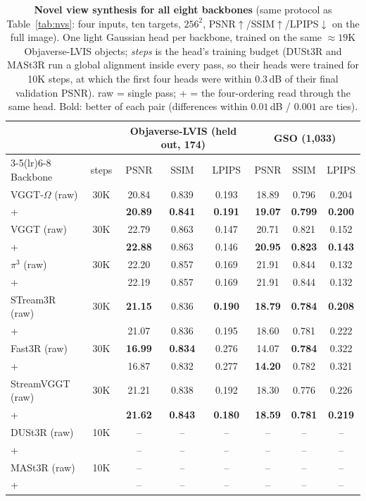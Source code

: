 \begin{table}[t]
\centering\scriptsize\setlength{\tabcolsep}{3.5pt}
\caption{\textbf{Novel view synthesis for all eight backbones} (same protocol as Table~\ref{tab:nvs}: four inputs, ten targets,
$256^2$, PSNR$\uparrow$/SSIM$\uparrow$/LPIPS$\downarrow$ on the full image). One light Gaussian head per backbone, trained on the same
${\approx}19$K Objaverse-LVIS objects; \emph{steps} is the head's training budget (DUSt3R and MASt3R run a global alignment
inside every pass, so their heads were trained for 10K steps, at which the first four heads were within $0.3$\,dB of their
final validation PSNR). raw = single pass; +\smr{} = the four-ordering read through the same head. Bold: better of each pair
(differences within $0.01$\,dB / $0.001$ are ties).}
\label{tab:nvs-full}
\begin{tabular}{@{}l c ccc ccc@{}}
\toprule
& & \multicolumn{3}{c}{Objaverse-LVIS (held out, 174)} & \multicolumn{3}{c}{GSO (1{,}033)} \\
\cmidrule(lr){3-5}\cmidrule(lr){6-8}
Backbone & steps & PSNR & SSIM & LPIPS & PSNR & SSIM & LPIPS \\
\midrule
VGGT-$\Omega$ (raw) & 30K & 20.84 & 0.839 & 0.193 & 18.89 & 0.796 & 0.204 \\
\;+\smr{} & & \textbf{20.89} & \textbf{0.841} & \textbf{0.191} & \textbf{19.07} & \textbf{0.799} & \textbf{0.200} \\
VGGT (raw) & 30K & 22.79 & 0.863 & 0.147 & 20.71 & 0.821 & 0.152 \\
\;+\smr{} & & \textbf{22.88} & 0.863 & 0.146 & \textbf{20.95} & \textbf{0.823} & \textbf{0.143} \\
$\pi^3$ (raw) & 30K & 22.20 & 0.857 & 0.169 & 21.91 & 0.844 & 0.132 \\
\;+\smr{} & & 22.19 & 0.857 & 0.169 & 21.91 & 0.844 & 0.132 \\
STream3R (raw) & 30K & \textbf{21.15} & 0.836 & \textbf{0.190} & \textbf{18.79} & \textbf{0.784} & \textbf{0.208} \\
\;+\smr{} & & 21.07 & 0.836 & 0.195 & 18.60 & 0.781 & 0.222 \\
Fast3R (raw) & 30K & \textbf{16.99} & \textbf{0.834} & 0.276 & 14.07 & \textbf{0.784} & 0.322 \\
\;+\smr{} & & 16.87 & 0.832 & 0.277 & \textbf{14.20} & 0.782 & 0.321 \\
StreamVGGT (raw) & 30K & 21.21 & 0.838 & 0.192 & 18.30 & 0.776 & 0.226 \\
\;+\smr{} & & \textbf{21.62} & \textbf{0.843} & \textbf{0.180} & \textbf{18.59} & \textbf{0.781} & \textbf{0.219} \\
DUSt3R (raw) & 10K & -- & -- & -- & -- & -- & -- \\
\;+\smr{} & & -- & -- & -- & -- & -- & -- \\
MASt3R (raw) & 10K & -- & -- & -- & -- & -- & -- \\
\;+\smr{} & & -- & -- & -- & -- & -- & -- \\
\bottomrule
\end{tabular}
\end{table}
